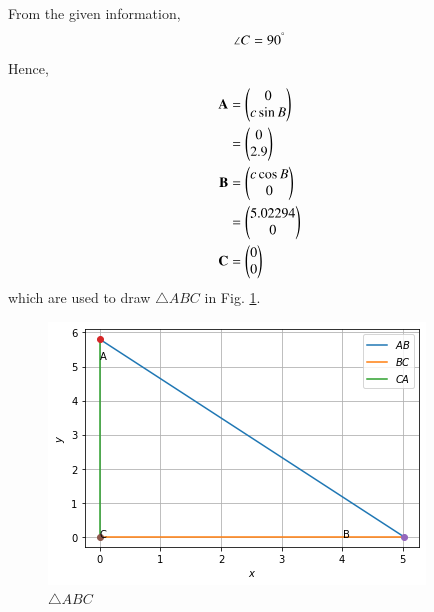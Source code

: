From the given information, 
\begin{align}
\angle C = 90^{\degree}
\end{align}
Hence, 
\begin{align}
\mathbf{A}&=\begin{pmatrix}0\\c\sin{B}\end{pmatrix}\\
              &=\begin{pmatrix}0\\2.9\end{pmatrix}\\
\mathbf{B} &=\begin{pmatrix}c\cos{B}\\0\end{pmatrix}\\
               &=\begin{pmatrix}5.02294\\0\end{pmatrix}\\
\mathbf{C} &=\begin{pmatrix}0\\0\end{pmatrix}
\end{align}
which are used to draw $\triangle ABC$ in Fig. \ref{triangle/20/fig:triangle ABC}.
%
\begin{figure}[!ht]
\centering
\includegraphics[width=\columnwidth]{solutions/triangle/20/Figure01.png}
\caption{$\triangle ABC$}
\label{triangle/20/fig:triangle ABC}
\end{figure}    
